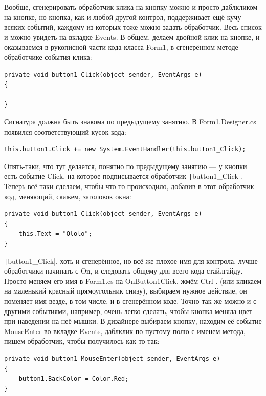 \documentclass{../../text-style}
\begin{document}
Вообще, сгенерировать обработчик клика на кнопку можно и просто даблкликом на кнопке, но кнопка, как и любой другой контрол, поддерживает ещё кучу всяких событий, каждому из которых тоже можно задать обработчик. Весь список и можно увидеть на вкладке Events. В общем, делаем двойной клик на кнопке, и оказываемся в рукописной части кода класса Form1, в сгенерённом методе-обработчике события клика:

\begin{verbatim}
private void button1_Click(object sender, EventArgs e)
{

}
\end{verbatim}

Сигнатура должна быть знакома по предыдущему занятию. В Form1.Designer.cs появился соответствующий кусок кода:

\begin{verbatim}
this.button1.Click += new System.EventHandler(this.button1_Click);
\end{verbatim}

Опять-таки, что тут делается, понятно по предыдущему занятию --- у кнопки есть событие Click, на которое подписывается обработчик \texttt|button1_Click|. Теперь всё-таки сделаем, чтобы что-то происходило, добавив в этот обработчик код, меняющий, скажем, заголовок окна:

\begin{verbatim}
private void button1_Click(object sender, EventArgs e)
{
    this.Text = "Ololo";
}
\end{verbatim}

\texttt|button1_Click|, хоть и сгенерённое, но всё же плохое имя для контрола, лучше обработчики начинать с On, и следовать общему для всего кода стайлгайду. Просто меняем его имя в Form1.cs на OnButton1Click, жмём Ctrl-. (или кликаем на маленький красный прямоугольник снизу), выбираем нужное действие, он поменяет имя везде, в том числе, и в сгенерённом коде. Точно так же можно и с другими событиями, например, очень легко сделать, чтобы кнопка меняла цвет при наведении на неё мышки. В дизайнере выбираем кнопку, находим её событие MouseEnter во вкладке Events, даблклик по пустому полю с именем метода, пишем обработчик, чтобы получилось как-то так:

\begin{verbatim}
private void button1_MouseEnter(object sender, EventArgs e)
{
    button1.BackColor = Color.Red;
}
\end{verbatim}
\end{document}

